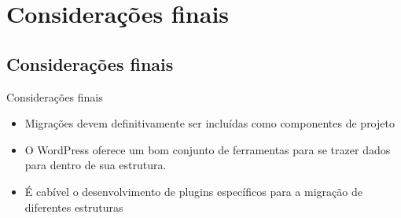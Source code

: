 \documentclass[handout]{beamer}
\begin{document}
\section{Considerações finais}
\subsection{Considerações finais}

\begin{frame}{Considerações finais}
  \begin{itemize}
    \item Migrações devem definitivamente ser incluídas como
          componentes de projeto
    \item O WordPress oferece um bom conjunto de ferramentas
          para se trazer dados para dentro de sua estrutura.
    \item É cabível o desenvolvimento de plugins específicos
          para a migração de diferentes estruturas
  \end{itemize}
\end{frame}
\end{document}
